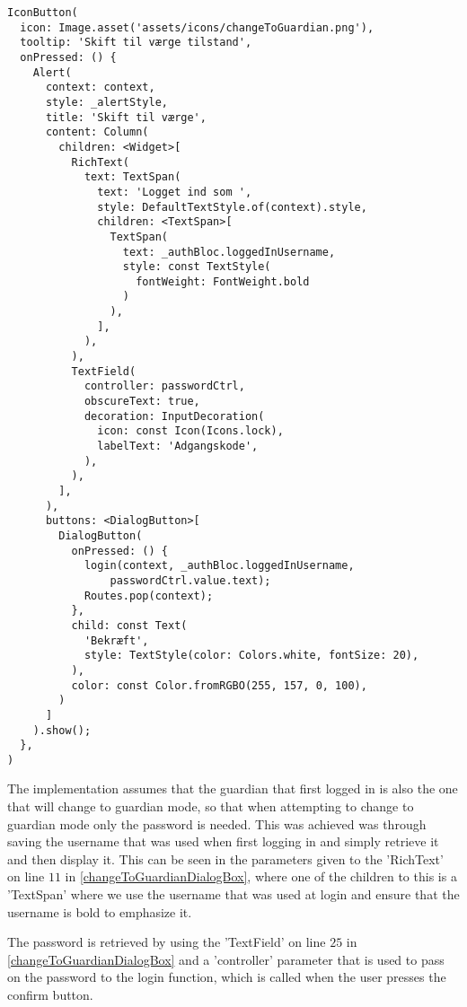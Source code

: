 \begin{lstlisting}[caption={Dialogbox for confirming password},captionpos=b, label=changeToGuardianDialogBox]
IconButton(
  icon: Image.asset('assets/icons/changeToGuardian.png'),
  tooltip: 'Skift til værge tilstand',
  onPressed: () {
    Alert(
      context: context,
      style: _alertStyle,
      title: 'Skift til værge',
      content: Column(
        children: <Widget>[
          RichText(
            text: TextSpan(
              text: 'Logget ind som ',
              style: DefaultTextStyle.of(context).style,
              children: <TextSpan>[
                TextSpan(
                  text: _authBloc.loggedInUsername,
                  style: const TextStyle(
                    fontWeight: FontWeight.bold
                  )
                ),
              ],
            ),
          ),
          TextField(
            controller: passwordCtrl,
            obscureText: true,
            decoration: InputDecoration(
              icon: const Icon(Icons.lock),
              labelText: 'Adgangskode',
            ),
          ),
        ],
      ),
      buttons: <DialogButton>[
        DialogButton(
          onPressed: () {
            login(context, _authBloc.loggedInUsername,
                passwordCtrl.value.text);
            Routes.pop(context);
          },
          child: const Text(
            'Bekræft',
            style: TextStyle(color: Colors.white, fontSize: 20),
          ),
          color: const Color.fromRGBO(255, 157, 0, 100),
        )
      ]
    ).show();
  },
)
\end{lstlisting}

The implementation assumes that the guardian that first logged in is also the one that will change to guardian mode, so that when attempting to change to guardian mode only the password is needed.
This was achieved was through saving the username that was used when first logging in and simply retrieve it and then display it. 
This can be seen in the parameters given to the 'RichText' on line $11$ in \autoref{changeToGuardianDialogBox}, where one of the children to this is a 'TextSpan' where we use the username that was used at login and ensure that the username is bold to emphasize it.

The password is retrieved by using the 'TextField' on line $25$ in \autoref{changeToGuardianDialogBox} and a 'controller' parameter that is used to pass on the password to the login function, which is called when the user presses the confirm button.

